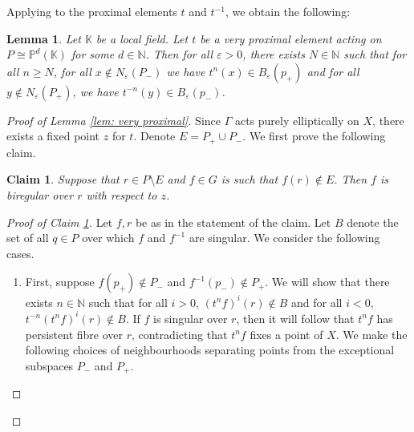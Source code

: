 \documentclass[12pt]{article}
\newtheorem{lem}[thm]{Lemma}
\newtheorem{clm}[thm]{Claim}
\theoremstyle{definition}
\newcommand{\N}{\mathbb{N}}
\newcommand{\K}{\mathbb{K}}
\begin{document}
Applying \cite[Corollary 2.87]{KapDrutu} to the proximal elements $t$ and $t^{-1}$, we obtain the following: 

\begin{lem}
    \label{very proximal NSD}
    Let $\K$ be a local field. Let $t$ be a very proximal element acting on $P \cong \mathbb{P}^d(\K)$ for some $d \in \N$.
    Then for all $\varepsilon > 0$, there exists $N \in \N$ such that for all $n \geq N$, for all $x \notin N_{\varepsilon}(P_-)$ we have $t^{n}(x) \in B_{\varepsilon}(p_+)$ and for all $y \notin N_{\varepsilon}(P_+)$, we have $t^{-n} (y) \in B_{\varepsilon}(p_-)$. 
\end{lem}

\begin{proof} [Proof of Lemma \ref{lem: very proximal}]
    Since $\Gamma$ acts purely elliptically on $X$, there exists a fixed point $z$ for $t$. Denote $E = P_+ \cup P_-$. %
    We first prove the following claim.

    \begin{clm}
    \label{lem: regularity lemma}
     Suppose that $r \in P \setminus E$ and $f \in G$ is such that $f(r) \notin E$. Then $f$ is biregular over $r$ with respect to $z$. 
\end{clm}

\begin{proof}[Proof of Claim \ref{lem: regularity lemma}]
    


    Let $f,r$ be as in the statement of the claim. Let $B$ denote the set of all $q \in P$ over which $f$ and $f^{-1}$ are singular. We consider the following cases. 

    \begin{enumerate}
        \item First, suppose $f(p_+) \notin P_-$ and $f^{-1}(p_-) \notin P_+$. We will show that there exists $n \in \N$ such that for all $i > 0$, $(t^n f)^i(r) \notin B$ and for all $i < 0$, $t^{-n}(t^n f)^i(r) \notin B$. If $f$ is singular over $r$, then it will follow that $t^n f$ has persistent fibre over $r$, contradicting that $t^nf$ fixes a point of $X$. We make the following choices of neighbourhoods separating points from the exceptional subspaces $P_-$ and $P_+$.
        

\end{enumerate}
\end{proof}
\end{proof}
\end{document}
